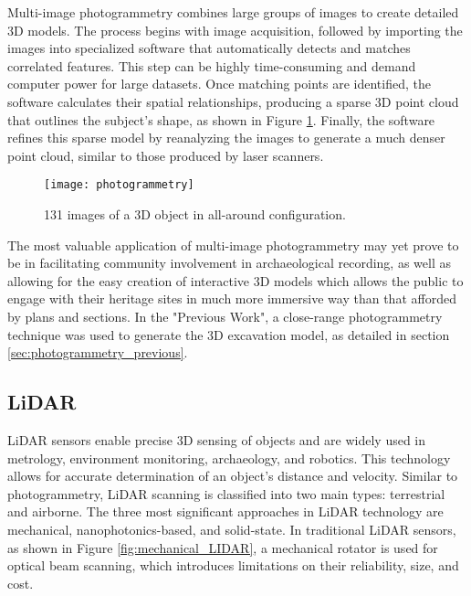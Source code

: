 Multi-image photogrammetry combines large groups of images to create detailed 3D models. The process begins with image acquisition, followed by importing 
the images into specialized software that automatically detects and matches correlated features. This step can be highly time-consuming and demand computer power for large datasets. 
Once matching points are identified, the software calculates their spatial relationships, producing a sparse \gls{3D} point cloud that outlines the subject’s shape, as shown in Figure \ref{fig:photo2}. 
Finally, the software refines this sparse model by reanalyzing the images to generate a much denser point cloud, similar to those produced by laser scanners.~\cite{mccarthy2014multi}

\begin{figure}[h!]
    \centering
    \texttt{[image: photogrammetry]}
    \caption{131 images of a \gls{3D} object in all-around configuration.~\cite{luhmann2016sensor}}
    \label{fig:photo2}
\end{figure} 
\FloatBarrier

 
  
The most valuable application of multi-image photogrammetry
may yet prove to be in facilitating community involvement in
archaeological recording, as well as allowing for the easy creation of
interactive \gls{3D} models which allows the public to
engage with their heritage sites in much more immersive way than
that afforded by plans and sections. In the "Previous Work", a close-range photogrammetry technique was used to generate the \gls{3D} excavation model, as detailed in section \ref{sec:photogrammetry_previous}.

\subsection{LiDAR}
\label{sec:lidar}

\gls{LiDAR} sensors enable precise \gls{3D} sensing of objects and are widely used in metrology, environment monitoring, archaeology, and robotics.
This technology allows for accurate determination of an object’s distance and velocity. 
Similar to photogrammetry, \gls{LiDAR} scanning is classified into two main types: terrestrial and airborne.
The three most significant approaches in \gls{LiDAR} technology are mechanical, nanophotonics-based, and solid-state.
In traditional \gls{LiDAR} sensors, as shown in Figure \ref{fig:mechanical_LIDAR}, a mechanical rotator is used for optical beam scanning, which introduces limitations on their reliability, size, and cost.~\cite{li2022progress}

